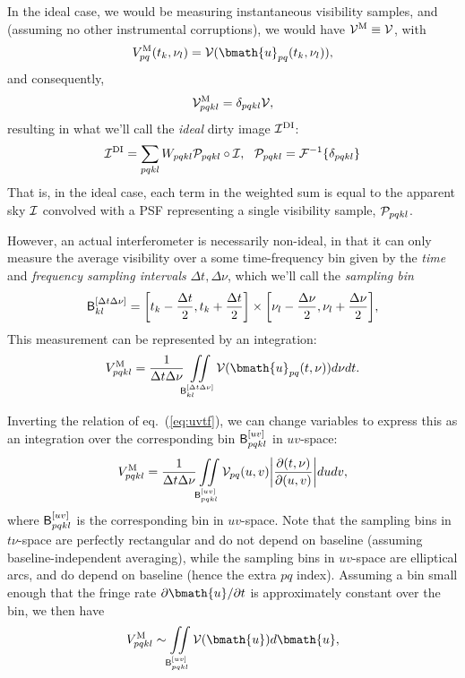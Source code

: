 \documentclass[useAMS,usenatbib]{mn2e}
\begin{document}
In the ideal case, we would be measuring instantaneous visibility samples, and (assuming no other instrumental corruptions), we would have $\mathcal{V}^\mathrm{M}\equiv\mathcal{V}$, with 
\begin{equation}
\Vm_{pq}(t_k,\nu_l)  = \VV(\bmath{u}_{pq}(t_k,\nu_l)),
\end{equation}
and consequently,
\begin{equation}
\label{eq:inst-sampled-visibility}
\mathcal{V}^\mathrm{M}_{pqkl} = \delta_{pqkl} \mathcal{V},
\end{equation}
resulting in what we'll call the \emph{ideal} dirty image 
$\mathcal{I}^\mathrm{DI}$:
\begin{equation}
\label{eq:imaging:DI}
\mathcal{I}^\mathrm{DI} =  \sum_{pqkl} W_{pqkl} \mathcal{P}_{pqkl} \circ \mathcal{I},~~\mathcal{P}_{pqkl}=\mathcal{F}^{-1}\{ \delta_{pqkl} \}
\end{equation}
That is, in the ideal case, each term in the weighted sum is equal to the apparent sky $\mathcal{I}$ convolved with a PSF representing a single visibility sample, $\mathcal{P}_{pqkl}$.

However, an actual interferometer is necessarily non-ideal, in that it can only measure the average visibility over a some time-frequency bin given by
the \emph{time} and \emph{frequency sampling intervals} $\Delta t,\Delta \nu$, which we'll call the \emph{sampling bin}
\begin{equation}
\mathsf{B}^{[\Delta t\Delta\nu]}_{kl} = \bigg [ t_k-\frac{\Delta t}{2},t_k+\frac{\Delta t}{2} \bigg ]
\times
\bigg [ \nu_l-\frac{\Delta\nu}{2},\nu_l+\frac{\Delta\nu}{2} \bigg ],  
\end{equation}
This measurement can be represented by an integration:
\begin{equation}
\Vm_{pqkl} = \frac{1}{\Delta t \Delta \nu} 
\iint\limits_{\Btf_{kl}}
\VV(\bmath{u}_{pq}(t,\nu))d\nu dt.
\label{eq2:conti}
\end{equation}

Inverting the relation of eq.~(\ref{eq:uvtf}), we can change variables to express this as an integration over the 
corresponding bin $\mathsf{B}^{[uv]}_{pqkl}$ in $uv$-space:
\begin{equation}
V^\mathrm{M}_{pqkl} = \frac{1}{\Delta t \Delta \nu} 
\iint\limits_{\mathsf{B}^{[uv]}_{pqkl}}
\mathcal{V}_{pq}(u,v)\bigg| \frac{\partial(t,\nu)}{\partial(u,v)}\bigg| dudv,
\label{eq2:conti:uv}
\end{equation}
where $\mathsf{B}^{[uv]}_{pqkl}$ is the corresponding bin in $uv$-space. Note that the sampling bins in $t\nu$-space are
perfectly rectangular and do not depend on baseline (assuming baseline-independent averaging), while the 
sampling bins in $uv$-space are elliptical arcs, and do depend on baseline (hence the extra $pq$ index). 
Assuming a bin small enough that the fringe rate $\partial\bmath{u}/\partial t$ is approximately constant over 
the bin, we then have \begin{equation}
\Vm_{pqkl} \sim \iint\limits_{\Buv_{pqkl}}
\VV (\bmath{u}) d\bmath{u},
\label{eq2:conti:uv1}
\end{equation}
\end{document}
